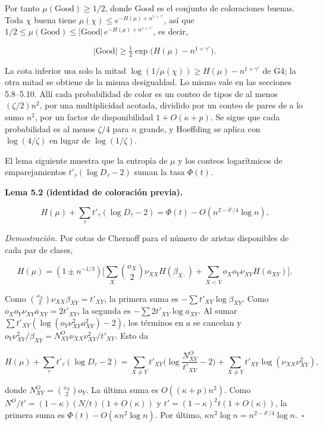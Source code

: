 \documentclass[spanish,11pt,a4paper]{article}
\begin{document}
Por tanto \(\mu(\mathrm{Good})\ge1/2\), donde \(\mathrm{Good}\) es el conjunto de coloraciones buenas. Toda \(\chi\) buena tiene \(\mu(\chi)\le e^{-H(\mu)+n^{1+\gamma'}}\), así que \(1/2\le\mu(\mathrm{Good})\le|\mathrm{Good}|\,e^{-H(\mu)+n^{1+\gamma'}}\), es decir,

\nopagebreak[4]
\[|\mathrm{Good}|\ge\tfrac12\exp\big(H(\mu)-n^{1+\gamma'}\big).\]

La cota inferior usa solo la mitad \(\log(1/\mu(\chi))\ge H(\mu)-n^{1+\gamma'}\) de G4; la otra mitad se obtiene de la misma desigualdad. Lo mismo vale en las secciones 5.8--5.10. Allí cada probabilidad de color es un conteo de tipos de al menos \((\zeta/2)n^2\), por una multiplicidad acotada, dividido por un conteo de pares de a lo sumo \(n^2\), por un factor de disponibilidad \(1+O(\kappa+p)\). Se sigue que cada probabilidad es al menos \(\zeta/4\) para \(n\) grande, y Hoeffding se aplica con \(\log(4/\zeta)\) en lugar de \(\log(1/\zeta)\).

El lema siguiente muestra que la entropía de \(\mu\) y los conteos logarítmicos de emparejamientos \(t'_\tau(\log D_\tau-2)\) suman la tasa \(\Phi(t)\).

\textbf{Lema 5.2 (identidad de coloración previa).}

\nopagebreak[4]
\[H(\mu)+\sum_\tau t'_\tau(\log D_\tau-2)=\Phi(t)-O(n^{2-\delta'/4}\log n).\]

\emph{Demostración.} Por cotas de Chernoff para el número de aristas disponibles de cada par de clases,

\nopagebreak[4]
\[H(\mu)=(1\pm n^{-1/3})\Big[\sum_X\binom{o_X}{2}\nu_{XX}H(\beta_{X\cdot})+\sum_{X<Y}o_Xo_Y\nu_{XY}H(a_{XY})\Big].\]

Como \(\binom{o_X}{2}\nu_{XX}\beta_{XY}=t'_{XY}\), la primera suma es \(-\sum t'_{XY}\log\beta_{XY}\). Como \(o_Xo_Y\nu_{XY}a_{XY}=2t'_{XY}\), la segunda es \(-\sum2t'_{XY}\log a_{XY}\). Al sumar \(\sum t'_{XY}(\log(o_Y\nu_{XY}^2a_{XY}^2)-2)\), los términos en \(a\) se cancelan y \(o_Y\nu_{XY}^2/\beta_{XY}=N^O_{XY}\nu_{XX}\nu_{XY}^2/t'_{XY}\). Esto da

\nopagebreak[4]
\[H(\mu)+\sum_\tau t'_\tau(\log D_\tau-2)=\sum_{X\ne Y}t'_{XY}\Big(\log\frac{N^O_{XY}}{t'_{XY}}-2\Big)+\sum_{X\ne Y}t'_{XY}\log(\nu_{XX}\nu_{XY}^2),\]

donde \(N^O_{XY}=\binom{o_X}{2}o_Y\). La última suma es \(O((\kappa+p)n^2)\). Como \(N^O/t'=(1-\kappa)(N/t)(1+O(\kappa))\) y \(t'=(1-\kappa)^2t(1+O(\kappa))\), la primera suma es \(\Phi(t)-O(\kappa n^2\log n)\). Por último, \(\kappa n^2\log n=n^{2-\delta'/4}\log n\).~\(\square\)
\end{document}
